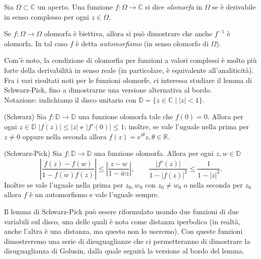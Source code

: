 \begin{defn}
  Sia $\Omega \subset \mathbb{C}$ un aperto. Una funzione $f:\Omega \longrightarrow \mathbb{C}$ si dice \textit{olomorfa} in $\Omega$ se è derivabile in senso complesso per ogni $z \in \Omega$.
\end{defn}

\begin{defn}
  Se $f: \Omega \longrightarrow \Omega$ olomorfa è biettiva, allora si può dimostrare che anche $f^{-1}$ è olomorfa. In tal caso $f$ è detta \textit{automorfismo} (in senso olomorfo di $\Omega$).
\end{defn}

Com'è noto, la condizione di olomorfia per funzioni a valori complessi è molto più forte della derivabilità in senso reale (in particolare, è equivalente all'analiticità). Fra i vari risultati noti per le funzioni olomorfe, ci interessa studiare il lemma di Schwarz-Pick, fino a dimostrarne una versione alternativa al bordo. \\

Notazione: indichiamo il disco unitario con $\mathbb{D}=\{z \in \mathbb{C} \mid |z|<1\}$.

\begin{lm}
  (Schwarz) Sia $f:\mathbb{D} \longrightarrow \mathbb{D}$ una funzione olomorfa tale che $f(0)=0$. Allora per ogni $z \in \mathbb{D}$ $|f(z)| \le |z|$ e $|f'(0)| \le 1$; inoltre, se vale l'uguale nella prima per $z \not=0$ oppure nella seconda allora $f(z)=e^{i\theta}z, \theta \in \mathbb{R}$.
\end{lm}

\begin{lm}
  (Schwarz-Pick) Sia $f:\mathbb{D} \longrightarrow \mathbb{D}$ una funzione olomorfa.
  Allora per ogni $z, w \in \mathbb{D}$
  $$\left|\frac{f(z)-f(w)}{1-\overline{f(w)}f(z)}\right| \le \left|\frac{z-w}{1-\bar{w}z}\right|, \qquad \frac{|f'(z)|}{1-|f(z)|^2} \le \frac{1}{1-|z|^2}.$$
  Inoltre se vale l'uguale nella prima per $z_0, w_0$ con $z_0 \not=w_0$ o nella seconda per $z_0$ allora $f$ è un automorfismo e vale l'uguale sempre.
\end{lm}

Il lemma di Schwarz-Pick può essere riformulato usando due funzioni di due variabili sul disco, una delle quali è nota come distanza iperbolica (in realtà, anche l'altra è una distanza, ma questo non lo useremo). Con queste funzioni dimostreremo una serie di disuguaglianze che ci permetteranno di dimostrare la disuguaglianza di Golusin, dalla quale seguirà la versione al bordo del lemma.

